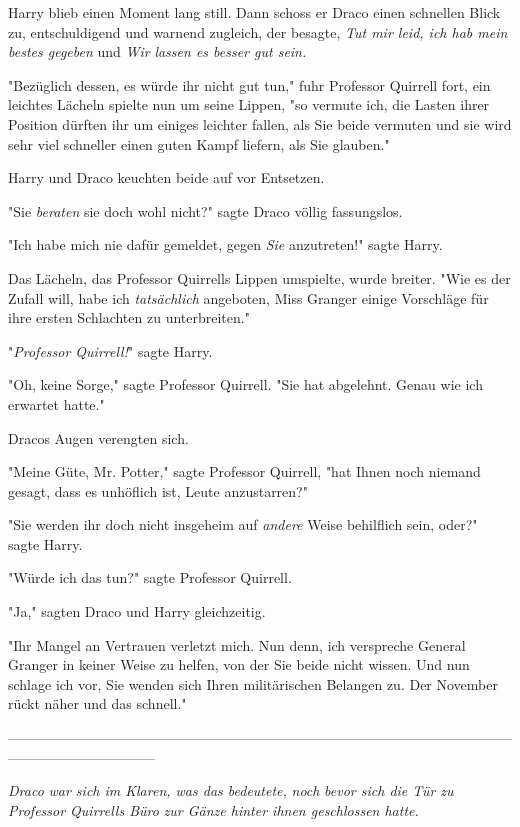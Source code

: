 {Harry blieb einen Moment lang still. Dann schoss er Draco einen schnellen Blick zu, entschuldigend und warnend zugleich, der besagte, \emph{Tut mir leid, ich hab mein bestes gegeben} und \emph{Wir} \emph{lassen es besser gut sein.}

"Bezüglich dessen, es würde ihr nicht gut tun," fuhr Professor Quirrell fort, ein leichtes Lächeln spielte nun um seine Lippen, "so vermute ich, die Lasten ihrer Position dürften ihr um einiges leichter fallen, als Sie beide vermuten und sie wird sehr viel schneller einen guten Kampf liefern, als Sie glauben."

Harry und Draco keuchten beide auf vor Entsetzen.

"Sie \emph{beraten} sie doch wohl nicht?" sagte Draco völlig fassungslos.

"Ich habe mich nie dafür gemeldet, gegen \emph{Sie} anzutreten!" sagte Harry.

Das Lächeln, das Professor Quirrells Lippen umspielte, wurde breiter. "Wie es der Zufall will, habe ich \emph{tatsächlich} angeboten, Miss Granger einige Vorschläge für ihre ersten Schlachten zu unterbreiten."

"\emph{Professor Quirrell!}" sagte Harry.

"Oh, keine Sorge," sagte Professor Quirrell. "Sie hat abgelehnt. Genau wie ich erwartet hatte."

Dracos Augen verengten sich.

"Meine Güte, Mr. Potter," sagte Professor Quirrell, "hat Ihnen noch niemand gesagt, dass es unhöflich ist, Leute anzustarren?"

"Sie werden ihr doch nicht insgeheim auf \emph{andere} Weise behilflich sein, oder?" sagte Harry.

"Würde ich das tun?" sagte Professor Quirrell.

"Ja," sagten Draco und Harry gleichzeitig.

"Ihr Mangel an Vertrauen verletzt mich. Nun denn, ich verspreche General Granger in keiner Weise zu helfen, von der Sie beide nicht wissen. Und nun schlage ich vor, Sie wenden sich Ihren militärischen Belangen zu. Der November rückt näher und das schnell."

--------------------------------------------------------------------------------------------------------------------------------------------

\emph{Draco} \emph{war sich im Klaren, was das bedeutete,} \emph{noch} \emph{bevor sich die Tür} \emph{zu Professor Quirrells Büro} \emph{zur Gänze hinter ihnen geschlossen hatte.}

}
